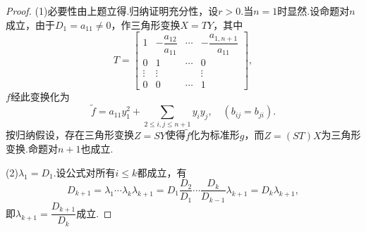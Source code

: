 \begin{proof}
	(1)必要性由上题立得.归纳证明充分性，设$r>0$.当$n=1$时显然.设命题对$n$成立，由于$D_1=a_{11}\ne0$，作三角形变换$X=TY$，其中
	\[
		T=\begin{bmatrix}
			1      & -\dfrac{a_{12}}{a_{11}} & \cdots & -\dfrac{a_{1,n+1}}{a_{11}} \\
			0      & 1                       & \cdots & 0                          \\
			\vdots & \vdots                  &        & \vdots                     \\
			0      & 0                       & \cdots & 1
		\end{bmatrix},
	\]
	$f$经此变换化为
	\[
		\tilde{f}=a_{11}y_1^2+\sum_{2\le i,j\le n+1}y_iy_j,\quad(b_{ij}=b_{ji}).
	\]
	按归纳假设，存在三角形变换$Z=SY$使得$\tilde{f}$化为标准形$g$，而$Z=(ST)X$为三角形变换.命题对$n+1$也成立.

	(2)$\lambda_1=D_1$.设公式对所有$i\leq k$都成立，有
	\[
		D_{k+1}=\lambda_1\cdots\lambda_k\lambda_{k+1}=D_1\frac{D_2}{D_1}\cdots\frac{D_k}{D_{k-1}}\lambda_{k+1}=D_k\lambda_{k+1},
	\]
	即$\lambda_{k+1}=\dfrac{D_{k+1}}{D_k}$成立.
\end{proof}
